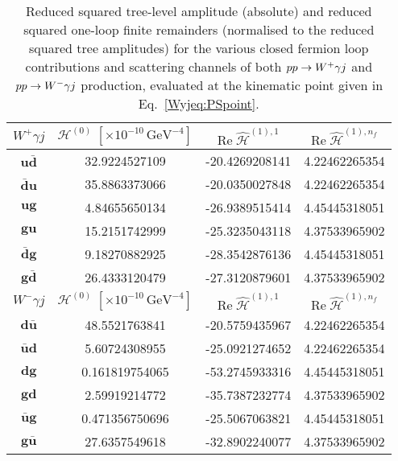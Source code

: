 \documentclass[main.tex]{subfiles}
\begin{document}
\begin{table}[t!]
\centering
\begin{tabularx}{1\textwidth}{|C{0.4}|C{1.2}|C{1.2}|C{1.2}|}
\hline
$W^+\gamma j$ & $\mathcal{H}^{(0)}  \; [\times 10^{-10}\,\mathrm{GeV}^{-4}] $ & $\mathrm{Re}\;\hat{\mathcal{H}}^{(1),1}$ & $\mathrm{Re}\;\hat{\mathcal{H}}^{(1),n_f}$  \\
\hline
$\mathbf{u\bar{d}}$ & 32.9224527109  & -20.4269208141 & 4.22462265354  \\
$\mathbf{\bar{d}u}$ & 35.8863373066  & -20.0350027848 & 4.22462265354  \\
$\mathbf{ug}      $ & 4.84655650134  & -26.9389515414 & 4.45445318051  \\
$\mathbf{gu}      $ & 15.2151742999  & -25.3235043118 & 4.37533965902  \\
$\mathbf{\bar{d}g}$ & 9.18270882925  & -28.3542876136 & 4.45445318051  \\
$\mathbf{g\bar{d}}$ & 26.4333120479  & -27.3120879601 & 4.37533965902  \\
\hline
\hline
$W^-\gamma j$ & $\mathcal{H}^{(0)}  \; [\times 10^{-10}\,\mathrm{GeV}^{-4}] $ & $\mathrm{Re}\;\hat{\mathcal{H}}^{(1),1}$ & $\mathrm{Re}\;\hat{\mathcal{H}}^{(1),n_f}$  \\
\hline
$\mathbf{d\bar{u}}$ & 48.5521763841  & -20.5759435967 & 4.22462265354  \\
$\mathbf{\bar{u}d}$ & 5.60724308955  & -25.0921274652 & 4.22462265354  \\
$\mathbf{dg}      $ & 0.161819754065 & -53.2745933316 & 4.45445318051  \\
$\mathbf{gd}      $ & 2.59919214772  & -35.7387232774 & 4.37533965902  \\
$\mathbf{\bar{u}g}$ & 0.471356750696 & -25.5067063821 & 4.45445318051  \\
$\mathbf{g\bar{u}}$ & 27.6357549618  & -32.8902240077 & 4.37533965902  \\
\hline
\end{tabularx}
\caption{\label{Wyjtab:benchmarkfinremsq1L} 
Reduced squared tree-level amplitude (absolute) and reduced squared one-loop finite remainders (normalised to the reduced squared tree amplitudes)
for the various closed fermion loop contributions and scattering channels of both $pp\to W^+\gamma j$ and $pp\to W^-\gamma j$ production,
evaluated at the kinematic point given in Eq.~\eqref{Wyjeq:PSpoint}.
}
\end{table}

\renewcommand{\theequation}{F.\arabic{equation}}
\end{document}
